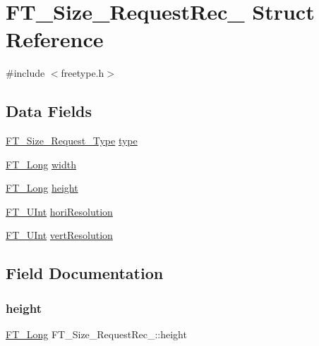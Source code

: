 \hypertarget{struct_f_t___size___request_rec__}{}\section{F\+T\+\_\+\+Size\+\_\+\+Request\+Rec\+\_\+ Struct Reference}
\label{struct_f_t___size___request_rec__}


{\ttfamily \#include $<$freetype.\+h$>$}

\subsection*{Data Fields}
\begin{DoxyCompactItemize}
\item 
\hyperlink{freetype_8h_ac10a6bdce0674edb378e81f8a19b6867}{F\+T\+\_\+\+Size\+\_\+\+Request\+\_\+\+Type} \hyperlink{struct_f_t___size___request_rec___a7644b04dd2b26c0698df558775320494}{type}
\item 
\hyperlink{fttypes_8h_a7fa72a1f0e79fb1860c5965789024d6f}{F\+T\+\_\+\+Long} \hyperlink{struct_f_t___size___request_rec___a7b044d36af318b053d5e3939eb0d5039}{width}
\item 
\hyperlink{fttypes_8h_a7fa72a1f0e79fb1860c5965789024d6f}{F\+T\+\_\+\+Long} \hyperlink{struct_f_t___size___request_rec___af8142450d8d032e1870d758cdcfa51a9}{height}
\item 
\hyperlink{fttypes_8h_abcb8db4dbf35d2b55a9e8c7b0926dc52}{F\+T\+\_\+\+U\+Int} \hyperlink{struct_f_t___size___request_rec___a3a85704d13561d9db53aa60f7805ec73}{hori\+Resolution}
\item 
\hyperlink{fttypes_8h_abcb8db4dbf35d2b55a9e8c7b0926dc52}{F\+T\+\_\+\+U\+Int} \hyperlink{struct_f_t___size___request_rec___a86601c38d91064b6efe256a9e99c56f4}{vert\+Resolution}
\end{DoxyCompactItemize}


\subsection{Field Documentation}
\mbox{\label{struct_f_t___size___request_rec___af8142450d8d032e1870d758cdcfa51a9}} 
\subsubsection{\texorpdfstring{height}{height}}
{\footnotesize\ttfamily \hyperlink{fttypes_8h_a7fa72a1f0e79fb1860c5965789024d6f}{F\+T\+\_\+\+Long} F\+T\+\_\+\+Size\+\_\+\+Request\+Rec\+\_\+\+::height}


